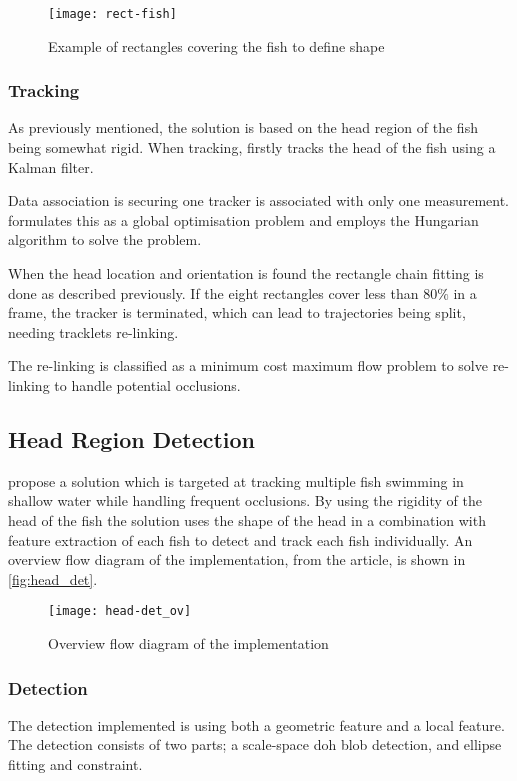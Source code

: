 \begin{figure}[h]
  \centering
  \texttt{[image: rect-fish]}
  \caption{Example of rectangles covering the fish to define shape \citep{HongWang2016}}
  \label{fig:rect-fish}
\end{figure}

\subsubsection{Tracking}
As previously mentioned, the solution is based on the head region of the fish being somewhat rigid. When tracking, \cite{HongWang2016} firstly tracks the head of the fish using a Kalman filter. 

Data association is securing one tracker is associated with only one measurement. \cite{HongWang2016} formulates this as a global optimisation problem and employs the Hungarian algorithm to solve the problem.

When the head location and orientation is found the rectangle chain fitting is done as described previously. If the eight rectangles cover less than $80\%$ in a frame, the tracker is terminated, which can lead to trajectories being split, needing tracklets re-linking.

The re-linking is classified as a minimum cost maximum flow problem to solve re-linking to handle potential occlusions.

\subsection{Head Region Detection}
\cite{Qian2014} propose a solution which is targeted at tracking multiple fish swimming in shallow water while handling frequent occlusions. By using the rigidity of the head of the fish the solution uses the shape of the head in a combination with feature extraction of each fish to detect and track each fish individually. An overview flow diagram of the implementation, from the article, is shown in \autoref{fig:head_det}.

\begin{figure}[H]
	\centering
	\texttt{[image: head-det\_ov]}
	\caption{Overview flow diagram of the implementation \citep{Qian2014}}
	\label{fig:head_det}
\end{figure}

\subsubsection{Detection}
The detection implemented is using both a geometric feature and a local feature. The detection consists of two parts; a scale-space \gls{doh} blob detection, and ellipse fitting and constraint.

